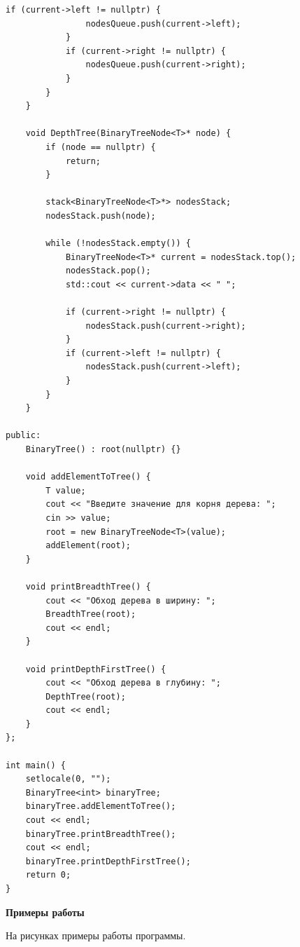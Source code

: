 \documentclass[12pt, a4paper]{article}
\begin{document}
\begin{lstlisting}[caption={Исходный код}, label={lst:label1}]
            if (current->left != nullptr) {
                nodesQueue.push(current->left);
            }
            if (current->right != nullptr) {
                nodesQueue.push(current->right);
            }
        }
    }

    void DepthTree(BinaryTreeNode<T>* node) {
        if (node == nullptr) {
            return;
        }

        stack<BinaryTreeNode<T>*> nodesStack;
        nodesStack.push(node);

        while (!nodesStack.empty()) {
            BinaryTreeNode<T>* current = nodesStack.top();
            nodesStack.pop();
            std::cout << current->data << " ";

            if (current->right != nullptr) {
                nodesStack.push(current->right);
            }
            if (current->left != nullptr) {
                nodesStack.push(current->left);
            }
        }
    }

public:
    BinaryTree() : root(nullptr) {}

    void addElementToTree() {
        T value;
        cout << "Введите значение для корня дерева: ";
        cin >> value;
        root = new BinaryTreeNode<T>(value);
        addElement(root);
    }

    void printBreadthTree() {
        cout << "Обход дерева в ширину: ";
        BreadthTree(root);
        cout << endl;
    }

    void printDepthFirstTree() {
        cout << "Обход дерева в глубину: ";
        DepthTree(root);
        cout << endl;
    }
};

int main() {
    setlocale(0, "");
    BinaryTree<int> binaryTree;
    binaryTree.addElementToTree();
    cout << endl;
    binaryTree.printBreadthTree();
    cout << endl;
    binaryTree.printDepthFirstTree();
    return 0;
}
\end{lstlisting}
\newpage
\begin{center}
	\textbf{Примеры работы}
\end{center}
На рисунках примеры работы программы.
\end{document}
